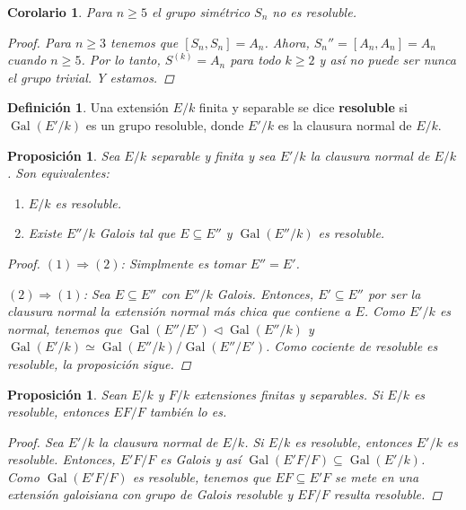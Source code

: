 \documentclass[12pt]{book}
\newtheorem{prop}[teo]{Proposición}
\newtheorem{cor}[teo]{Corolario}
\theoremstyle{definition}
\newtheorem{defn}[teo]{Definición}
\DeclareMathOperator{\Gal}{Gal}
\begin{document}
\begin{cor}
Para $n\geq 5$ el grupo simétrico $S_n$ no es resoluble.
\begin{proof}
Para $n\geq 3$ tenemos que $[S_n,S_n]=A_n$. Ahora, $S_n'' = [A_n,A_n] = A_n$ cuando $n\geq 5$. Por lo tanto, $S^{(k)}=A_n$ para todo $k\geq 2$ y así no puede ser nunca el grupo trivial. Y estamos.
\end{proof}
\end{cor}

\begin{defn}
Una extensión $E/k$ finita y separable se dice \textbf{resoluble} si $\Gal(E'/k)$ es un grupo resoluble, donde $E'/k$ es la clausura normal de $E/k$.
\end{defn}

\begin{prop}
Sea $E/k$ separable y finita y sea $E'/k$ la clausura normal de $E/k$. Son equivalentes:
\begin{enumerate}
\item $E/k$ es resoluble.
\item Existe $E''/k$ Galois tal que $E\subseteq E''$ y $\Gal(E''/k)$ es resoluble.
\end{enumerate}
\begin{proof}
$(1)\Longrightarrow (2)$: Simplmente es tomar $E''=E'$.

$(2)\Longrightarrow (1)$: Sea $E\subseteq E''$ con $E''/k$ Galois. Entonces, $E'\subseteq E''$ por ser la clausura normal la extensión normal más chica que contiene a $E$. Como $E'/k$ es normal, tenemos que $\Gal(E''/E')\triangleleft \Gal(E''/k)$ y $\Gal(E'/k)\simeq \Gal(E''/k)/\Gal(E''/E')$. Como cociente de resoluble es resoluble, la proposición sigue.
\end{proof}
\end{prop}

\begin{prop}
Sean $E/k$ y $F/k$ extensiones finitas y separables. Si $E/k$ es resoluble, entonces $EF/F$ también lo es.
\begin{proof}
Sea $E'/k$ la clausura normal de $E/k$. Si $E/k$ es resoluble, entonces $E'/k$ es resoluble. Entonces, $E'F/F$ es Galois y así $\Gal(E'F/F)\subseteq \Gal(E'/k)$. Como $\Gal(E'F/F)$ es resoluble, tenemos que $EF\subseteq E'F$ se mete en una extensión galoisiana con grupo de Galois resoluble y $EF/F$ resulta resoluble.
\end{proof}
\end{prop}
\end{document}
